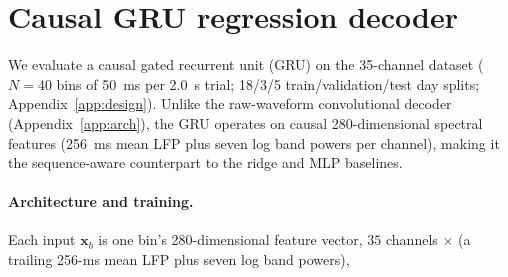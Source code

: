 \documentclass[11pt]{article}
\begin{document}
\section{Causal GRU regression decoder}\label{sec:gru}

We evaluate a causal gated recurrent unit (GRU) on the 35-channel dataset ($N=40$ bins of 50~ms per 2.0~s trial; 18/3/5 train/validation/test day splits; Appendix~\ref{app:design}). Unlike the raw-waveform convolutional decoder (Appendix~\ref{app:arch}), the GRU operates on causal 280-dimensional spectral features (256~ms mean LFP plus seven log band powers per channel), making it the sequence-aware counterpart to the ridge and MLP baselines.

\paragraph{Architecture and training.}
Each input $\mathbf{x}_b$ is one bin's 280-dimensional feature vector, $35$ channels $\times$ (a trailing 256-ms mean LFP plus seven log band powers),
\end{document}

